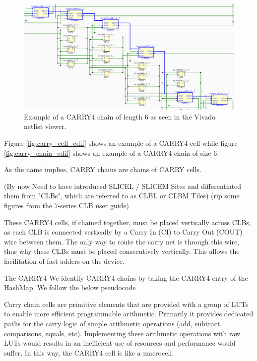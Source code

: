 \documentclass[twocolumn]{article}
\begin{document}
            \begin{figure}[t]
                \centering
                \includegraphics[width=\textwidth]{figures/carry_chain_edif.png}
                \caption{Example of a CARRY4 chain of length 6 as seen in the Vivado netlist viewer.}
            \end{figure}

            Figure \ref{fig:carry_cell_edif} shows an example of a CARRY4 cell while figure \ref{fig:carry_chain_edif} shows an example of a CARRY4 chain of size 6. 

            As the name implies, CARRY chains are chains of CARRY cells. 


            (By now Need to have introduced SLICEL / SLICEM Sites and differentiated them from "CLBs", which are referred to as CLBL or CLBM Tiles)
            (rip some figures from the 7-series CLB user guide)

            These CARRY4 cells, if chained together, must be placed vertically across CLBs, as each CLB is connected vertically by a Carry In (CI) to Carry Out (COUT) wire between them. 
            The only way to route the carry net is through this wire, thus why these CLBs must be placed consecutively vertically. 
            This allows the facilitation of fast adders on the device. 

            The CARRY4 
            We identify CARRY4 chains by taking the CARRY4 entry of the HashMap. 
            We follow the below pseudocode 




            Carry chain cells are primitive elements that are provided with a group of LUTs to enable more efficient programmable arithmetic. 
            Primarily it provides dedicated paths for the carry logic of simple arithmetic operations (add, subtract, comparisons, equals, etc). Implementing these arithmetic operations with raw LUTs would results in an inefficient use of resources and performance would suffer. 
            In this way, the CARRY4 cell is like a macrocell. 
\end{document}

